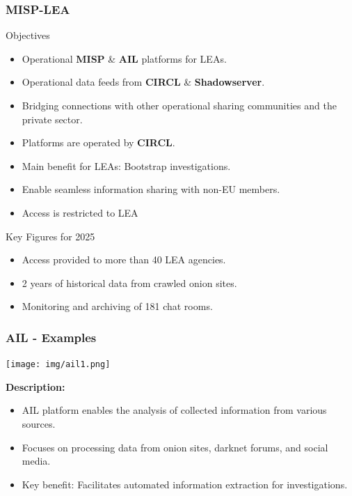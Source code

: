 \begin{frame}
\frametitle{MISP-LEA}
\begin{block}{Objectives}
    \begin{itemize}
        \item Operational \textbf{MISP} \& \textbf{AIL} platforms for LEAs.
        \item Operational data feeds from \textbf{CIRCL} \& \textbf{Shadowserver}.
        \item Bridging connections with other operational sharing communities and the private sector.
        \item Platforms are operated by \textbf{CIRCL}.
        \item Main benefit for LEAs: \alert{Bootstrap investigations}.
        \item Enable seamless information sharing with non-EU members.
        \item Access is restricted to LEA
    \end{itemize}
\end{block}

\begin{block}{Key Figures for 2025}
    \begin{itemize}
        \item Access provided to more than 40 LEA agencies.
        \item 2 years of historical data from crawled onion sites.
        \item Monitoring and archiving of 181 chat rooms.
    \end{itemize}
\end{block}
\end{frame}

\begin{frame}
    \frametitle{AIL - Examples}
    \begin{minipage}{0.45\textwidth} %
        \texttt{[image: img/ail1.png]}
    \end{minipage}%
    \hfill
    \begin{minipage}{0.5\textwidth} %
        \textbf{Description:}
        \begin{itemize}
            \item AIL platform enables the analysis of collected information from various sources.
            \item Focuses on processing data from onion sites, darknet forums, and social media.
            \item Key benefit: Facilitates automated information extraction for investigations.
        \end{itemize}
    \end{minipage}
\end{frame}


